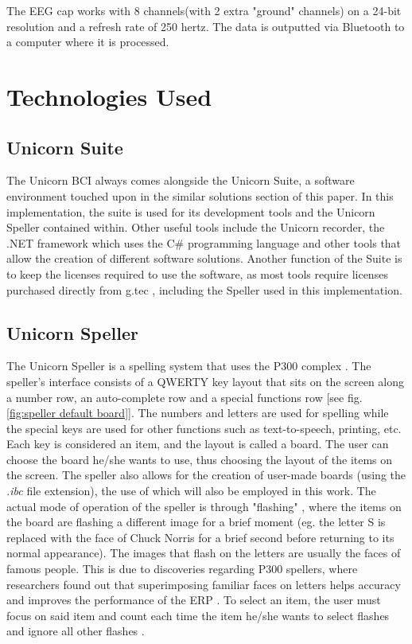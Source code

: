 The EEG cap works with 8 channels(with 2 extra "ground" channels) on a 24-bit resolution and a refresh rate of 250 hertz. The data is outputted via Bluetooth to a computer where it is processed.


\section{Technologies Used}
\subsection{Unicorn Suite}
The Unicorn BCI always comes alongside the Unicorn Suite, a software environment touched upon in the similar solutions section of this paper. In this implementation, the suite is used for its development tools and the Unicorn Speller contained within. Other useful tools include the Unicorn recorder, the .NET framework which uses the C\# programming language and other tools that allow the creation of different software solutions. Another function of the Suite is to keep the licenses required to use the software, as most tools require licenses purchased directly from g.tec \cite{Unicorn_Shop}, including the Speller used in this implementation.


\subsection{Unicorn Speller}
The Unicorn Speller is a spelling system that uses the P300 complex \cite{UnicornSuite_Manual}. The speller's interface consists of a QWERTY key layout that sits on the screen along a number row, an auto-complete row and a special functions row [see fig. \ref{fig:speller default board}]. The numbers and letters are used for spelling while the special keys are used for other functions such as text-to-speech, printing, etc. Each key is considered an item, and the layout is called a board. The user can choose the board he/she wants to use, thus choosing the layout of the items on the screen. The speller also allows for the creation of user-made boards (using the \textit{.ibc} file extension), the use of which will also be employed in this work. 
\vspace{\baselineskip}\newline
The actual mode of operation of the speller is through "flashing" \cite{UnicornSuite_Manual}, where the items on the board are flashing a different image for a brief moment (eg. the letter S is replaced with the face of Chuck Norris for a brief second before returning to its normal appearance). The images that flash on the letters are usually the faces of famous people. This is due to discoveries regarding P300 spellers, where researchers found out that superimposing familiar faces on letters helps accuracy and improves the performance of the ERP \cite{Li_2015}\cite{Kaufmann_2011}. To select an item, the user must focus on said item and count each time the item he/she wants to select flashes and ignore all other flashes \cite{UnicornSuite_Manual}.

